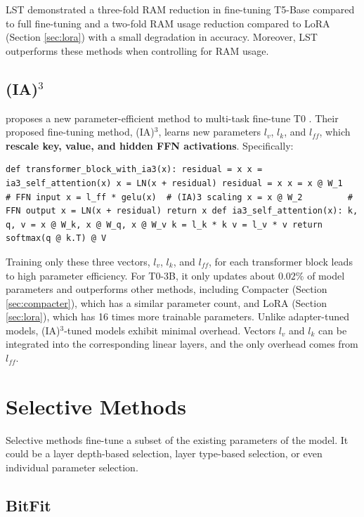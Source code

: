 LST demonstrated a three-fold RAM reduction in fine-tuning T5-Base compared to full fine-tuning and a two-fold RAM usage reduction compared to LoRA (Section \ref{sec:lora}) with a small degradation in accuracy. Moreover, LST outperforms these methods when controlling for RAM usage.

\subsection{(IA)$^3$}
\label{sec:ia3}

\citet{t_few} proposes a new parameter-efficient method to multi-task fine-tune T0 \citep{t_few}. Their proposed fine-tuning method, (IA)$^3$, learns new parameters $l_v$, $l_k$, and $l_{ff}$, which \textbf{rescale key, value, and hidden FFN activations}. Specifically:

\begin{lstlisting}
def transformer_block_with_ia3(x): residual = x x = ia3_self_attention(x) x = LN(x + residual) residual = x x = x @ W_1         # FFN input x = l_ff * gelu(x)  # (IA)3 scaling x = x @ W_2         # FFN output x = LN(x + residual) return x def ia3_self_attention(x): k, q, v = x @ W_k, x @ W_q, x @ W_v k = l_k * k v = l_v * v return softmax(q @ k.T) @ V
\end{lstlisting}

Training only these three vectors, $l_v$, $l_k$, and $l_{ff}$, for each transformer block leads to high parameter efficiency. For T0-3B, it only updates about $0.02\%$ of model parameters and outperforms other methods, including Compacter (Section \ref{sec:compacter}), which has a similar parameter count, and LoRA (Section \ref{sec:lora}), which has 16 times more trainable parameters. Unlike adapter-tuned models, (IA)$^3$-tuned models exhibit minimal overhead. Vectors $l_v$ and $l_k$ can be integrated into the corresponding linear layers, and the only overhead comes from $l_{ff}$.

\section{Selective Methods}
\label{sec:selective_methods}

Selective methods fine-tune a subset of the existing parameters of the model. It could be a layer depth-based selection, layer type-based selection, or even individual parameter selection.

\subsection{BitFit}
\label{sec:bitfit}

